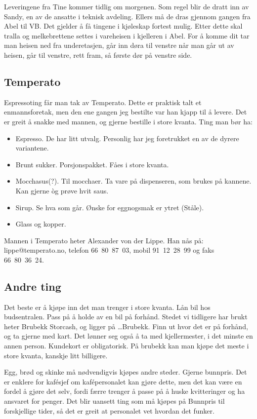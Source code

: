 Leveringene fra Tine kommer tidlig om morgenen. Som regel blir de dratt inn
av Sandy, en av de ansatte i teknisk avdeling. Ellers må de dras gjennom
gangen fra Abel til VB. Det gjelder å få tingene i kjøleskap fortest mulig.
Etter dette skal tralla og melkebrettene settes i vareheisen i kjelleren i
Abel. For å komme dit tar man heisen ned fra underetasjen, går inn døra
til venstre når man går ut av heisen, går til venstre, rett fram, så første dør på
venstre side.

\subsection{Temperato}
Espressoting får man tak av Temperato. Dette er praktisk talt et enmannsforetak,
men den ene gangen jeg bestilte var han kjapp til å levere. Det er greit å
snakke med mannen, og gjerne bestille i store kvanta. Ting man bør ha:
\begin{itemize}
	\item Espresso. De har litt utvalg. Personlig har jeg foretrukket
		en av de dyrere variantene.
	\item Brunt sukker. Porsjonspakket. Fåes i store kvanta.
	\item Mocchasus(?). Til mocchaer. Ta vare på dispenseren, som
		brukes på kannene. Kan gjerne \`og prøve hvit saus.
	\item Sirup. Se hva som går. Ønske for eggnogsmak er ytret (Ståle).
	\item Glass og kopper.
\end{itemize}
Mannen i Temperato heter Alexander von der Lippe. Han nås på: 
\mbox{\textsf{lippe@temperato.no}}, telefon 66~80~87~03, mobil
91~12~28~99 og faks 66~80~36~24.

\subsection{Andre ting}
Det beste er å kjøpe inn det man trenger i store kvanta. Lån bil hos
budsentralen. Pass på å holde av en bil på forhånd. Stedet vi tidligere
har brukt heter Brubekk Storcash, og ligger på \dots Brubekk. Finn ut 
hvor det er på forhånd, og ta gjerne med kart. Det lønner seg også å
ta med kjellermester, i det minste en annen person. Kundekort er obligatorisk.
På brubekk kan man kjøpe det meste i store kvanta, kanskje litt billigere.

Egg, brød og skinke må nødvendigvis kjøpes andre steder. Gjerne bunnpris. Det er
enklere for kaf\'esjef om kaf\'epersonalet kan gjøre dette, men det kan
være en fordel å gjøre det selv, fordi færre trenger å passe på å huske kvitteringer 
og ha ansvaret for penger. Det blir uansett ting som må kjøpes på
Bunnpris til forskjellige tider, så det er greit at personalet vet hvordan
det funker.

